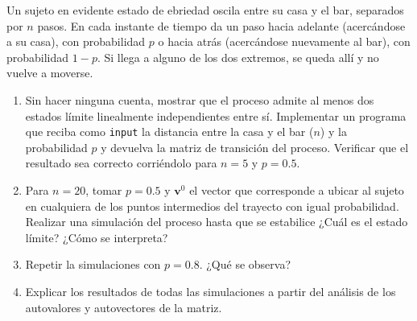 \begin{enunciado}{\ejercicio}
  Un sujeto en evidente estado de ebriedad oscila entre su casa y el bar, separados
  por $n$ pasos. En cada instante de tiempo da un paso hacia adelante (acercándose a su casa),
  con probabilidad $p$ o hacia atrás (acercándose nuevamente al bar), con probabilidad $1 - p$.
  Si llega a alguno de los dos extremos, se queda allí y no vuelve a moverse.

  \begin{enumerate}[label=(\alph*)]
    \item Sin hacer ninguna cuenta, mostrar que el proceso admite al menos dos estados límite
          linealmente independientes entre sí. Implementar un programa que reciba como \texttt{input} la
          distancia entre la casa y el bar ($n$) y la probabilidad $p$ y devuelva la matriz de transición
          del proceso. Verificar que el resultado sea correcto corriéndolo para $n = 5$ y $p = 0.5$.

    \item Para $n = 20$, tomar $p = 0.5$ y $\bm{v}^0$ el vector que corresponde a ubicar al sujeto
          en cualquiera de los puntos intermedios del trayecto con igual probabilidad. Realizar una
          simulación del proceso hasta que se estabilice ¿Cuál es el estado límite? ¿Cómo se interpreta?

    \item Repetir la simulaciones con $p = 0.8$. ¿Qué se observa?

    \item Explicar los resultados de todas las simulaciones a partir del análisis de los autovalores y autovectores de la matriz.
  \end{enumerate}
\end{enunciado}

